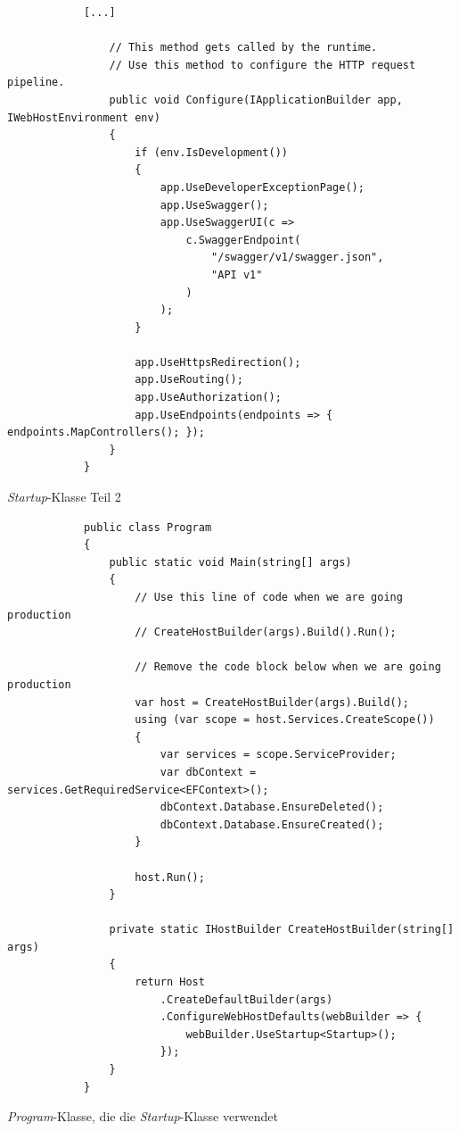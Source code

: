 \documentclass[a4paper, fontsize=11pt, parskip=half, twoside]{scrreprt}
\begin{document}
	\begin{listing}[ht]
		\begin{verbatim}
			[...]
				
				// This method gets called by the runtime. 
				// Use this method to configure the HTTP request pipeline.
				public void Configure(IApplicationBuilder app, IWebHostEnvironment env)
				{
					if (env.IsDevelopment())
					{
						app.UseDeveloperExceptionPage();
						app.UseSwagger();
						app.UseSwaggerUI(c => 
							c.SwaggerEndpoint(
								"/swagger/v1/swagger.json", 
								"API v1"
							)
						);
					}
					
					app.UseHttpsRedirection();
					app.UseRouting();
					app.UseAuthorization();
					app.UseEndpoints(endpoints => { endpoints.MapControllers(); });
				}
			}
		\end{verbatim}
		\caption{\emph{Startup}-Klasse Teil 2}
		\label{lst:startupClassPart2}
	\end{listing}

	\begin{listing}[ht]
		\begin{verbatim}
			public class Program
			{
				public static void Main(string[] args)
				{
					// Use this line of code when we are going production
					// CreateHostBuilder(args).Build().Run();
					
					// Remove the code block below when we are going production
					var host = CreateHostBuilder(args).Build();	
					using (var scope = host.Services.CreateScope())
					{
						var services = scope.ServiceProvider;
						var dbContext = services.GetRequiredService<EFContext>();
						dbContext.Database.EnsureDeleted();
						dbContext.Database.EnsureCreated();
					}
					
					host.Run();
				}
				
				private static IHostBuilder CreateHostBuilder(string[] args)
				{
					return Host
						.CreateDefaultBuilder(args)
						.ConfigureWebHostDefaults(webBuilder => { 
							webBuilder.UseStartup<Startup>(); 
						});
				}
			}
		\end{verbatim}
		\caption{\emph{Program}-Klasse, die die \emph{Startup}-Klasse verwendet}
		\label{lst:programClass}
	\end{listing}
\end{document}
